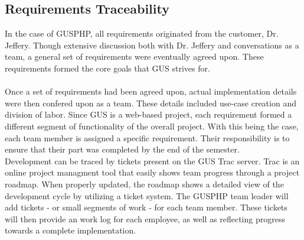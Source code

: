 \subsection{Requirements Traceability}
In the case of GUSPHP, all requirements originated from the customer, Dr. Jeffery. Though extensive discussion both with Dr. Jeffery and conversations as a team, a general set of requirements were eventually agreed upon. These requirements formed the core goals that GUS strives for. \\
\\
Once a set of requirements had been agreed upon, actual implementation details were then confered upon as a team. These details included use-case creation and division of labor. Since GUS is a web-based project, each requirement formed a different segment of functionality of the overall project. With this being the case, each team member is assigned a specific requirement. Their responsibility is to ensure that their part was completed by the end of the semester.
\\
Development can be traced by tickets present on the GUS Trac server. Trac is an online project managment tool that easily shows team progress through a project roadmap. When properly updated, the roadmap shows a detailed view of the development cycle by utilizing a ticket system. The GUSPHP team leader will add tickets - or small segments of work - for each team member. These tickets will then provide an work log for each employee, as well as reflecting progress towards a complete implementation. 
